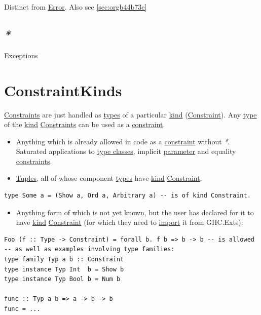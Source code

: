 \documentclass[a4paper,14pt,oneside]{book}
\begin{document}
Distinct from \hyperref[orgfd68dbf]{Error}. Also see \ref{sec:orgb44b73c}

\section{\emph{*}}
\label{sec:org06dd193}

\label{org5e0e139}Exceptions

\chapter{\label{org99b9b7c}ConstraintKinds}
\label{sec:orgf3ebefa}
\hyperref[orga836ae3]{Constraints} are just handled as \hyperref[org7da41fa]{types} of a particular \hyperref[orga17c4e5]{kind} (\hyperref[org6ba4663]{Constraint}).
Any \hyperref[org9fd0088]{type} of the \hyperref[orga17c4e5]{kind} \hyperref[orga836ae3]{Constraints} can be used as a \hyperref[org6ba4663]{constraint}.
\begin{itemize}
\item Anything which is already allowed in code as a \hyperref[org6ba4663]{constraint} without \emph{*}. Saturated applications to \hyperref[org9b1fb21]{type classes}, implicit \hyperref[org598769f]{parameter} and equality \hyperref[orga836ae3]{constraints}.
\item \hyperref[org218a05f]{Tuples}, all of whose component \hyperref[org7da41fa]{types} have \hyperref[orga17c4e5]{kind} \hyperref[org6ba4663]{Constraint}.
\end{itemize}
\begin{verbatim}
type Some a = (Show a, Ord a, Arbitrary a) -- is of kind Constraint.
\end{verbatim}
\begin{itemize}
\item Anything form of which is not yet known, but the user has declared for it to have \hyperref[orga17c4e5]{kind} \hyperref[org6ba4663]{Constraint} (for which they need to \hyperref[orgffe6437]{import} it from GHC.Exts):
\end{itemize}
\begin{verbatim}
Foo (f :: Type -> Constraint) = forall b. f b => b -> b -- is allowed
-- as well as examples involving type families:
type family Typ a b :: Constraint
type instance Typ Int  b = Show b
type instance Typ Bool b = Num b

func :: Typ a b => a -> b -> b
func = ...
\end{verbatim}
\end{document}
